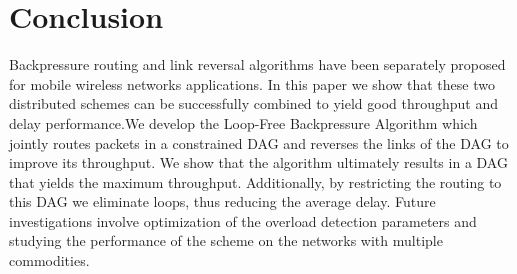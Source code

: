 \documentclass{sig-alternate-2013}
\begin{document}
\section{Conclusion}
Backpressure routing and link reversal algorithms have been separately proposed for mobile wireless networks applications. In this paper we show that these two distributed schemes can be successfully combined to yield good throughput and delay performance.We develop the Loop-Free Backpressure Algorithm which jointly routes packets in a constrained DAG and reverses the links of the DAG to improve its throughput. We show that the algorithm ultimately results in  a DAG that yields the maximum throughput. Additionally, by restricting the routing to this DAG we eliminate loops, thus reducing the average delay. 
Future investigations involve optimization of the overload detection parameters  and studying the performance of the scheme on the networks with  multiple commodities.
\end{document}

